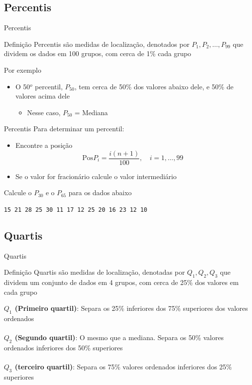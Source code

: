 \documentclass[10pt]{beamer}\usepackage[]{graphicx}\usepackage[]{color}
\theoremstyle{definition}
\begin{document}
\subsection{Percentis}

\begin{frame}{Percentis}
  \begin{block}{Definição}
    Percentis são medidas de localização, denotados por $P_1, P_2,
    \ldots, P_{99}$ que dividem os dados em 100 grupos, com cerca de 1\%
    cada grupo
  \end{block}
  Por exemplo
  \begin{itemize}
  \item O 50$^o$ percentil, $P_{50}$, tem cerca de 50\% dos valores
    abaixo dele, e 50\% de valores acima dele
    \begin{itemize}
    \item Nesse caso, $P_{50}$ = Mediana
    \end{itemize}
  \end{itemize}
\end{frame}

\begin{frame}[fragile]{Percentis}
  Para determinar um percentil:
  \begin{itemize}
  \item Encontre a posição
    \begin{equation*}
      \text{Pos} P_i = \frac{i(n+1)}{100}, \quad i=1,\ldots,99
    \end{equation*}
  \item Se o valor for fracionário calcule o valor intermediário
  \end{itemize}
  Calcule o $P_{30}$ e o $P_{65}$ para os dados abaixo
  \begin{center}
    \texttt{15 21 28 25 30 11 17 12 25 20 16 23 12 10}
  \end{center}

\end{frame}

\subsection{Quartis}

\begin{frame}{Quartis}
  \begin{block}{Definição}
    Quartis são medidas de localização, denotadas por $Q_1, Q_2, Q_3$
    que dividem um conjunto de dados em 4 grupos, com cerca de 25\% dos
    valores em cada grupo
  \end{block}
  \textbf{$Q_1$ (Primeiro quartil)}: Separa os 25\% inferiores dos 75\%
  superiores dos valores ordenados\\~\\
  \textbf{$Q_2$ (Segundo quartil)}: O mesmo que a mediana. Separa os
  50\% valores ordenados inferiores dos 50\% superiores\\~\\
  \textbf{$Q_3$ (terceiro quartil)}: Separa os 75\% valores ordenados
  inferiores dos 25\% superiores\\~\\
\end{frame}
\end{document}
